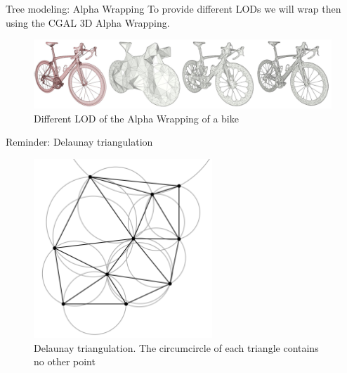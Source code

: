 \documentclass[10pt]{beamer}
\begin{document}
\begin{frame}{Tree modeling: Alpha Wrapping}
  To provide different LODs we will wrap then using the CGAL 3D 
  Alpha Wrapping\cite{cgal_alpha_wrapper}.

  \begin{figure}[H]
    \centering
        \centering
        \includegraphics[width=\textwidth]{images/aw3_bike_lod.jpg}
        \caption{Different LOD of the Alpha Wrapping of a bike}
\end{figure}
\end{frame}

\begin{frame}{Reminder: Delaunay triangulation}
  \begin{figure}[H]
    \centering
    \includegraphics[width=0.6\textwidth]{images/Delaunay_circumcircles_vectorial.svg.png}
    \caption{Delaunay triangulation.
    The circumcircle of each triangle contains no other point}
\end{figure}
\end{frame}
\end{document}
